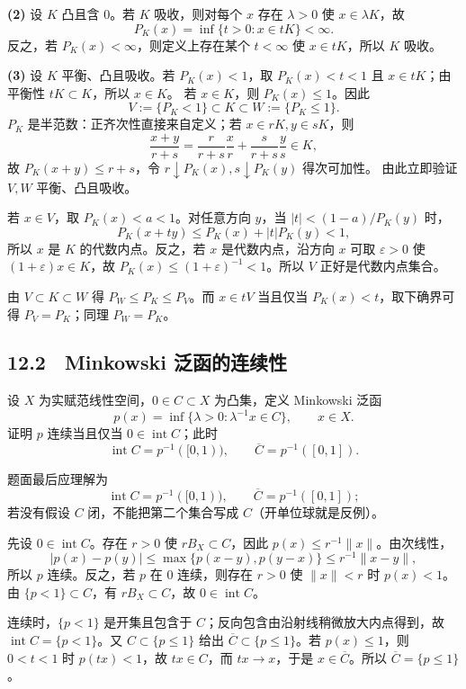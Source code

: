 \textbf{(2)} 设 $K$ 凸且含 $0$。若 $K$ 吸收，则对每个 $x$ 存在 $\lambda>0$
使 $x\in\lambda K$，故
\[
 P_K(x)=\inf\{t>0:x\in tK\}<\infty.
\]
反之，若 $P_K(x)<\infty$，则定义上存在某个 $t<\infty$ 使 $x\in tK$，所以
$K$ 吸收。

\textbf{(3)} 设 $K$ 平衡、凸且吸收。若 $P_K(x)<1$，取
$P_K(x)<t<1$ 且 $x\in tK$；由平衡性 $tK\subset K$，所以 $x\in K$。
若 $x\in K$，则 $P_K(x)\le1$。因此
\[
 V:=\{P_K<1\}\subset K\subset W:=\{P_K\le1\}.
\]
$P_K$ 是半范数：正齐次性直接来自定义；若 $x\in rK,y\in sK$，则
\[
 \frac{x+y}{r+s}=\frac r{r+s}\frac xr+\frac s{r+s}\frac ys\in K,
\]
故 $P_K(x+y)\le r+s$，令 $r\downarrow P_K(x),s\downarrow P_K(y)$ 得次可加性。
由此立即验证 $V,W$ 平衡、凸且吸收。

若 $x\in V$，取 $P_K(x)<a<1$。对任意方向 $y$，当
$|t|<(1-a)/P_K(y)$ 时，
\[
 P_K(x+ty)\le P_K(x)+|t|P_K(y)<1,
\]
所以 $x$ 是 $K$ 的代数内点。反之，若 $x$ 是代数内点，沿方向 $x$ 可取
$\varepsilon>0$ 使 $(1+\varepsilon)x\in K$，故
$P_K(x)\le(1+\varepsilon)^{-1}<1$。所以 $V$ 正好是代数内点集合。

由 $V\subset K\subset W$ 得 $P_W\le P_K\le P_V$。而
$x\in tV$ 当且仅当 $P_K(x)<t$，取下确界可得 $P_V=P_K$；同理
$P_W=P_K$。

\subsection*{12.2　Minkowski 泛函的连续性}

\begin{problem}
设 $X$ 为实赋范线性空间，$0\in C\subset X$ 为凸集，定义 Minkowski 泛函
\[
 p(x)=\inf\{\lambda>0:\lambda^{-1}x\in C\},\qquad x\in X.
\]
证明 $p$ 连续当且仅当 $0\in\operatorname{int}C$；此时
\[
 \operatorname{int}C=p^{-1}([0,1)),\qquad
 \overline C=p^{-1}([0,1]).
\]
\end{problem}

题面最后应理解为
\[
 \operatorname{int}C=p^{-1}([0,1)),\qquad
 \overline C=p^{-1}([0,1]);
\]
若没有假设 $C$ 闭，不能把第二个集合写成 $C$（开单位球就是反例）。

先设 $0\in\operatorname{int}C$。存在 $r>0$ 使 $rB_X\subset C$，因此
$p(x)\le r^{-1}\|x\|$。由次线性，
\[
 |p(x)-p(y)|\le\max\{p(x-y),p(y-x)\}\le r^{-1}\|x-y\|,
\]
所以 $p$ 连续。反之，若 $p$ 在 $0$ 连续，则存在 $r>0$ 使 $\|x\|<r$
时 $p(x)<1$。由 $\{p<1\}\subset C$，有 $rB_X\subset C$，故
$0\in\operatorname{int}C$。

连续时，$\{p<1\}$ 是开集且包含于 $C$；反向包含由沿射线稍微放大内点得到，故
$\operatorname{int}C=\{p<1\}$。又 $C\subset\{p\le1\}$ 给出
$\overline C\subset\{p\le1\}$。若 $p(x)\le1$，则 $0<t<1$ 时
$p(tx)<1$，故 $tx\in C$，而 $tx\to x$，于是 $x\in\overline C$。所以
$\overline C=\{p\le1\}$。

